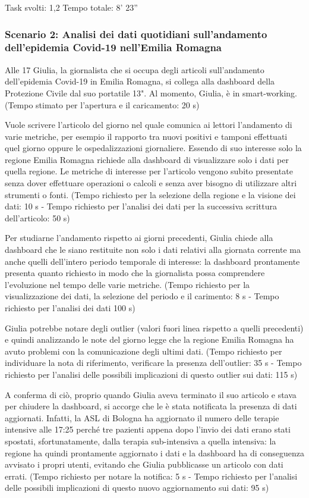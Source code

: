 Task svolti: 1,2
Tempo totale: 8' 23''

\subsubsection*{Scenario 2: Analisi dei dati quotidiani sull'andamento dell'epidemia Covid-19 nell'Emilia Romagna}
Alle 17 Giulia, la giornalista che si occupa degli articoli sull'andamento dell'epidemia Covid-19 in Emilia Romagna, si collega alla dashboard della Protezione Civile dal suo portatile 13". Al momento, Giulia, è in smart-working. (Tempo stimato per l'apertura e il caricamento: 20 s)

Vuole scrivere l'articolo del giorno nel quale comunica ai lettori l'andamento di varie metriche, per esempio il rapporto tra nuovi positivi e tamponi effettuati quel giorno oppure le ospedalizzazioni giornaliere. Essendo di suo interesse solo la regione Emilia Romagna richiede alla dashboard di visualizzare solo i dati per quella regione. Le metriche di interesse per l'articolo vengono subito presentate senza dover effettuare operazioni o calcoli e senza aver bisogno di utilizzare altri strumenti o fonti.
(Tempo richiesto per la selezione della regione e la visione dei dati: 10 s - Tempo richiesto per l'analisi dei dati per la successiva scrittura dell'articolo: 50 s)

Per studiarne l'andamento rispetto ai giorni precedenti, Giulia chiede alla dashboard che le siano restituite non solo i dati relativi alla giornata corrente ma anche quelli dell'intero periodo temporale di interesse: la dashboard prontamente presenta quanto richiesto in modo che la giornalista possa comprendere l'evoluzione nel tempo delle varie metriche. (Tempo richiesto per la visualizzazione dei dati, la selezione del periodo e il carimento: 8 s - Tempo richiesto per l'analisi dei dati 100 s)

Giulia potrebbe notare degli outlier (valori fuori linea rispetto a quelli precedenti) e quindi analizzando le note del giorno legge che la regione Emilia Romagna ha avuto problemi con la comunicazione degli ultimi dati. (Tempo richiesto per individuare la nota di riferimento, verificare la presenza dell'outlier: 35 s - Tempo richiesto per l'analisi delle possibili implicazioni di questo outlier sui dati: 115 s)

A conferma di ciò, proprio quando Giulia aveva terminato il suo articolo e stava per chiudere la dashboard, si accorge che le è stata notificata la presenza di dati aggiornati. Infatti, la ASL di Bologna ha aggiornato il numero delle terapie intensive alle 17:25 perché tre pazienti appena dopo l'invio dei dati erano stati spostati, sfortunatamente, dalla terapia sub-intensiva a quella intensiva: la regione ha quindi prontamente aggiornato i dati e la dashboard ha di conseguenza avvisato i propri utenti, evitando che Giulia pubblicasse un articolo con dati errati. (Tempo richiesto per notare la notifica: 5 s - Tempo richiesto per l'analisi delle possibili implicazioni di questo nuovo aggiornamento sui dati: 95 s)


